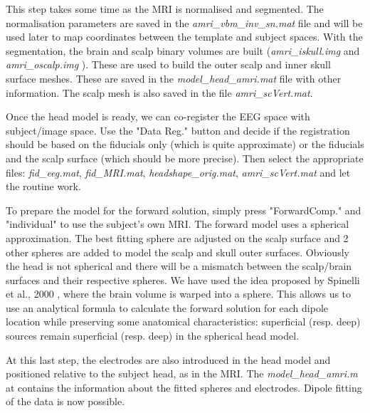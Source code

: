 This step takes some time as the MRI is normalised and segmented. The normalisation parameters are saved in the {\it amri\_vbm\_inv\_sn.mat} file and will be used later to map coordinates between the template and subject spaces. With the segmentation, the brain and scalp binary volumes are built ({\it amri\_iskull.img} and {\it amri\_oscalp.img} ). These are used to build the outer scalp and inner skull surface meshes. These are saved in the {\it model\_head\_amri.mat} file with other information. The scalp mesh is also saved in the file {\it amri\_scVert.mat}.

Once the head model is ready, we can co-register the EEG space with subject/image space. Use the "Data Reg." button and decide if the registration should be based on the fiducials only (which is quite approximate) or the fiducials and the scalp surface (which should be more precise). Then select the appropriate files: {\it fid\_eeg.mat}, {\it fid\_MRI.mat}, {\it headshape\_orig.mat}, {\it amri\_scVert.mat} and let the routine work.

To prepare the model for the forward solution, simply press "ForwardComp." and "individual" to use the subject's own MRI. The forward model uses a spherical approximation. The best fitting sphere are adjusted on the scalp surface and 2 other spheres are added to model the scalp and skull outer surfaces. Obviously the head is not spherical and there will be a mismatch between the scalp/brain surfaces and their respective spheres. We have used the idea proposed by Spinelli et al., 2000 \cite{Spinelli2000}, where the brain volume is warped into a sphere. This allows us to use an analytical formula to calculate the forward solution for each dipole location while preserving some anatomical characteristics: superficial (resp. deep) sources remain superficial (resp. deep) in the spherical head model.

At this last step, the electrodes are also introduced in the head
model and positioned relative to the subject head, as in the MRI. The
{\it model\_head\_amri.m} at contains the information about the fitted spheres and electrodes. Dipole fitting of the data is now possible.

